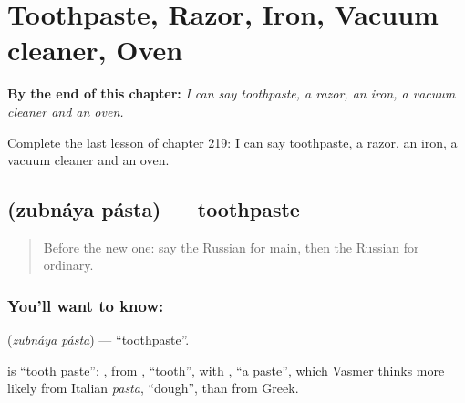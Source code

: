 
\chapter{Toothpaste, Razor, Iron, Vacuum cleaner, Oven}
\label{ch:ru-toothpaste-razor-iron-vacuum-cleaner-oven}

\begin{chapteropening}
\textbf{By the end of this chapter:} \emph{I can say toothpaste, a razor, an iron, a vacuum cleaner and an oven.}

Complete the last lesson of chapter 219: I can say toothpaste, a razor, an iron, a vacuum cleaner and an oven.
\end{chapteropening}

\section[\texorpdfstring{\ru{зубная} \ru{паста} (zubnáya pásta)}{зубная паста (zubnáya pásta)}]{  (zubnáya pásta) — toothpaste}

\label{lesson:RU-C219-zubnaya-pasta}



\begin{quote}
Before the new one: say the Russian for main, then the Russian for ordinary.
\end{quote}

\subsection*{You'll want to know:  }
\textbf{ } (\emph{zubnáya pásta}) — \textquotedblleft{}toothpaste\textquotedblright{}.

\begin{cousinweb}
\textbf{ } is \textquotedblleft{}tooth paste\textquotedblright{}: \emph{}, from \emph{}, \textquotedblleft{}tooth\textquotedblright{}, with \emph{}, \textquotedblleft{}a paste\textquotedblright{}, which Vasmer thinks more likely from Italian \emph{pasta}, \textquotedblleft{}dough\textquotedblright{}, than from Greek.
\end{cousinweb}

